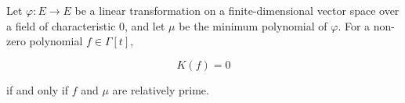Let $\varphi: E \to E$ be a linear transformation on a finite-dimensional vector space over a field of characteristic $0$, and let $\mu$ be the minimum polynomial of $\varphi$. For a non-zero polynomial $f \in \Gamma[t]$,

$$K(f) = 0$$

if and only if $f$ and $\mu$ are relatively prime.
